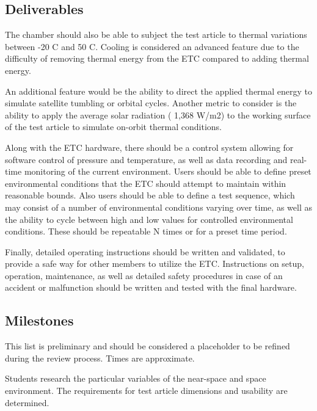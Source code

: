 \documentclass[conference]{IEEEtran} %
\begin{document}
\subsection{Deliverables}
\label{subsec:deliverables}
  The chamber should also be able to subject the test article to thermal variations between -20 C and 50 C. Cooling is considered an advanced feature due to the difficulty of removing thermal energy from the ETC compared to adding thermal energy. 

  An additional feature would be the ability to direct the applied thermal energy to simulate satellite tumbling or orbital cycles. Another metric to consider is the ability to apply the average solar radiation ( 1,368 W/m2) to the working surface of the test article to simulate on-orbit thermal conditions.

  Along with the ETC hardware, there should be a control system allowing for software control of pressure and temperature, as well as data recording and real-time monitoring of the current environment. Users should be able to define preset environmental conditions that the ETC should attempt to maintain within reasonable bounds. Also users should be able to define a test sequence, which may consist of a number of environmental conditions varying over time, as well as the ability to cycle between high and low values for controlled environmental conditions. These should be repeatable N times or for a preset time period.

  Finally, detailed operating instructions should be written and validated, to provide a safe way for other members to utilize the ETC. Instructions on setup, operation, maintenance, as well as detailed safety procedures in case of an accident or malfunction should be written and tested with the final hardware.

\subsection{Milestones}
\label{subsec:milestones}
  This list is preliminary and should be considered a placeholder to be refined during the review process. Times are approximate.

  Students research the particular variables of the near-space and space environment. The requirements for test article dimensions and usability are determined.
\end{document}
